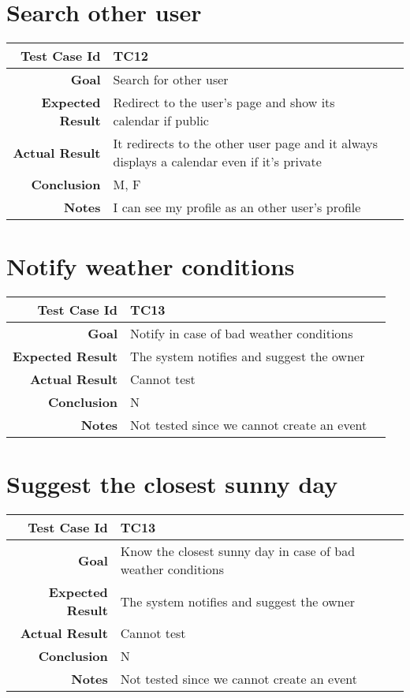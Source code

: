 \section{Search other user}
\begin{tabularx}{\linewidth}{|r|X|X|}
\hline   {\bf Test Case Id} &  TC12\\
  \hline  {\bf Goal} & Search for other user\\
  
  \hline  {\bf Expected Result} & Redirect to the user's page and show its calendar if public\\
  \hline  {\bf Actual Result} & It redirects to the other user page and it always displays a calendar even if it's private\\ 
  \hline  {\bf Conclusion} & M, F\\
    \hline  {\bf Notes} & I can see my profile as an other user's profile\\
  \hline
  
\end{tabularx}
\section{Notify weather conditions}
\begin{tabularx}{\linewidth}{|r|X|X|}
\hline   {\bf Test Case Id} &  TC13\\
  \hline  {\bf Goal} & Notify in case of bad weather conditions\\
  
  \hline  {\bf Expected Result} & The system notifies and suggest the owner\\
  \hline  {\bf Actual Result} & Cannot test\\
  \hline  {\bf Conclusion} & N\\
  \hline  {\bf Notes} & Not tested since we cannot create an event\\
  \hline
  
\end{tabularx}
\section{Suggest the closest sunny day}
\begin{tabularx}{\linewidth}{|r|X|X|}
\hline   {\bf Test Case Id} &  TC13\\
  \hline  {\bf Goal} & Know the closest sunny day in case of bad weather conditions\\
  
  \hline  {\bf Expected Result} & The system notifies and suggest the owner\\
   \hline  {\bf Actual Result} & Cannot test\\
  \hline  {\bf Conclusion} & N\\
  \hline  {\bf Notes} & Not tested since we cannot create an event\\
  \hline
  
\end{tabularx}






